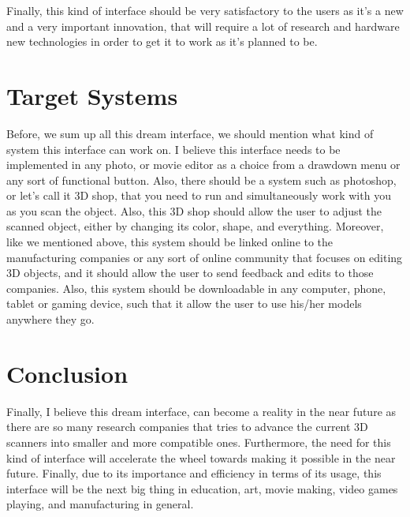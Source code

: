 \documentclass[12pt, oneside]{amsart}   	%
\begin{document}
Finally, this kind of interface should be very satisfactory to the users as it's a new and a very important innovation, that will require a lot of research and hardware new technologies in order to get it to work as it's planned to be.

\section{Target Systems}

Before, we sum up all this dream interface, we should mention what kind of system this interface can work on.  I believe this interface needs to be implemented in any photo, or movie editor as a choice from a drawdown menu or any sort of functional button.  Also, there should be a system such as photoshop, or let's call it 3D shop, that you need to run and simultaneously work with you as you scan the object.  Also, this 3D shop should allow the user to adjust the scanned object, either by changing its color, shape, and everything. Moreover, like we mentioned above, this system should be linked online to the manufacturing companies or any sort of online community that focuses on editing 3D objects, and it should allow the user to send feedback and edits to those companies.  Also, this system should be downloadable in any computer, phone, tablet or gaming device, such that it allow the user to use his/her models anywhere they go. 
\section{Conclusion}

Finally, I believe this dream interface, can become a reality in the near future as there are so many research companies that tries to advance the current 3D scanners into smaller and more compatible ones.  Furthermore, the need for this kind of interface will accelerate the wheel towards making it possible in the near future. Finally, due to its importance and efficiency in terms of its usage, this interface will be the next big thing in education, art, movie making, video games playing, and manufacturing in general.
\end{document}
